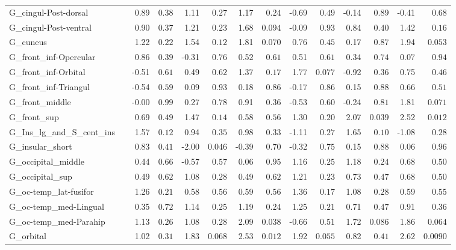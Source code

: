 {\begin{longtable}{llrrrrrrrrrrrr}
G\_cingul-Post-dorsal &  & 0.89 & $0.38$ & 1.11 & $0.27$ & 1.17 & $0.24$ & -0.69 & $0.49$ & -0.14 & $0.89$ & -0.41 & $0.68$ \\
G\_cingul-Post-ventral &  & 0.90 & $0.37$ & 1.21 & $0.23$ & 1.68 & $0.094$ & -0.09 & $0.93$ & 0.84 & $0.40$ & 1.42 & $0.16$ \\
G\_cuneus &  & 1.22 & $0.22$ & 1.54 & $0.12$ & 1.81 & $0.070$ & 0.76 & $0.45$ & 0.17 & $0.87$ & 1.94 & $0.053$ \\
G\_front\_inf-Opercular &  & 0.86 & $0.39$ & -0.31 & $0.76$ & 0.52 & $0.61$ & 0.51 & $0.61$ & 0.34 & $0.74$ & 0.07 & $0.94$ \\
G\_front\_inf-Orbital &  & -0.51 & $0.61$ & 0.49 & $0.62$ & 1.37 & $0.17$ & 1.77 & $0.077$ & -0.92 & $0.36$ & 0.75 & $0.46$ \\
G\_front\_inf-Triangul &  & -0.54 & $0.59$ & 0.09 & $0.93$ & 0.18 & $0.86$ & -0.17 & $0.86$ & 0.15 & $0.88$ & 0.66 & $0.51$ \\
G\_front\_middle &  & -0.00 & $0.99$ & 0.27 & $0.78$ & 0.91 & $0.36$ & -0.53 & $0.60$ & -0.24 & $0.81$ & 1.81 & $0.071$ \\
G\_front\_sup &  & 0.69 & $0.49$ & 1.47 & $0.14$ & 0.58 & $0.56$ & 1.30 & $0.20$ & 2.07 & $0.039$ & 2.52 & $0.012$ \\
G\_Ins\_lg\_and\_S\_cent\_ins &  & 1.57 & $0.12$ & 0.94 & $0.35$ & 0.98 & $0.33$ & -1.11 & $0.27$ & 1.65 & $0.10$ & -1.08 & $0.28$ \\
G\_insular\_short &  & 0.83 & $0.41$ & -2.00 & $0.046$ & -0.39 & $0.70$ & -0.32 & $0.75$ & 0.15 & $0.88$ & 0.06 & $0.96$ \\
G\_occipital\_middle &  & 0.44 & $0.66$ & -0.57 & $0.57$ & 0.06 & $0.95$ & 1.16 & $0.25$ & 1.18 & $0.24$ & 0.68 & $0.50$ \\
G\_occipital\_sup &  & 0.49 & $0.62$ & 1.08 & $0.28$ & 0.49 & $0.62$ & 1.21 & $0.23$ & 0.73 & $0.47$ & 0.68 & $0.50$ \\
G\_oc-temp\_lat-fusifor &  & 1.26 & $0.21$ & 0.58 & $0.56$ & 0.59 & $0.56$ & 1.36 & $0.17$ & 1.08 & $0.28$ & 0.59 & $0.55$ \\
G\_oc-temp\_med-Lingual &  & 0.35 & $0.72$ & 1.14 & $0.25$ & 1.19 & $0.24$ & 1.25 & $0.21$ & 0.71 & $0.47$ & 0.91 & $0.36$ \\
G\_oc-temp\_med-Parahip &  & 1.13 & $0.26$ & 1.08 & $0.28$ & 2.09 & $0.038$ & -0.66 & $0.51$ & 1.72 & $0.086$ & 1.86 & $0.064$ \\
G\_orbital &  & 1.02 & $0.31$ & 1.83 & $0.068$ & 2.53 & $0.012$ & 1.92 & $0.055$ & 0.82 & $0.41$ & 2.62 & $0.0090$ \\

\end{longtable}}
